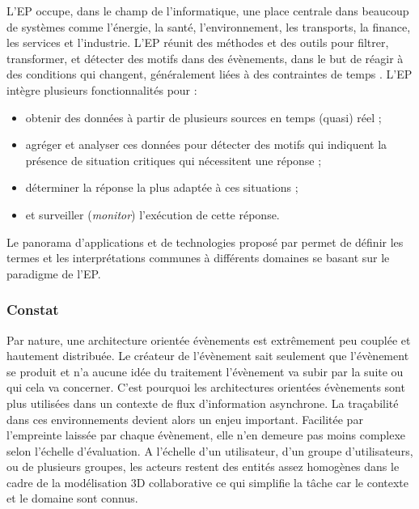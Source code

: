 L'\gls{EP} occupe, dans le champ de l'informatique, une place centrale dans 
beaucoup de systèmes comme l'énergie, la santé, l'environnement, les transports, 
la finance, les services et l'industrie. L'\gls{EP} réunit des méthodes et des outils 
pour filtrer, transformer, et détecter des motifs dans des évènements, dans le but 
de réagir à des conditions qui changent, généralement liées à des contraintes de 
temps \cite{Chandy2011}. L'\gls{EP} intègre plusieurs fonctionnalités pour :
\begin{itemize}
	\item obtenir des données à partir de plusieurs sources en temps (quasi) réel ;
	\item agréger et analyser ces données pour détecter des motifs qui indiquent la 
	présence de situation critiques qui nécessitent une réponse ;
	\item déterminer la réponse la plus adaptée à ces situations ;
	\item et surveiller (\textit{monitor}) l'exécution de cette réponse.
\end{itemize}

Le panorama d'applications et de technologies proposé par \cite{Hinze2009} 
permet de définir les termes et les interprétations communes à différents 
domaines se basant sur le paradigme de l'\gls{EP}. 





\subsubsection{Constat}

Par nature, une architecture orientée évènements est extrêmement peu couplée et 
hautement distribuée. Le créateur de l'évènement sait seulement que l'évènement 
se produit et n'a aucune idée du traitement l'évènement va subir par 
la suite ou qui cela va concerner. 
C'est pourquoi les architectures orientées évènements sont plus utilisées dans un 
contexte de flux d'information asynchrone. La traçabilité dans ces environnements 
devient alors un enjeu important. Facilitée par l'empreinte laissée par chaque 
évènement, elle n'en demeure pas moins complexe selon l'échelle d'évaluation. A 
l'échelle d'un utilisateur, d'un groupe d'utilisateurs, ou de plusieurs groupes, les 
acteurs restent des entités assez homogènes dans le cadre de la modélisation 3D 
collaborative ce qui simplifie la tâche car le contexte et le domaine sont 
connus.



